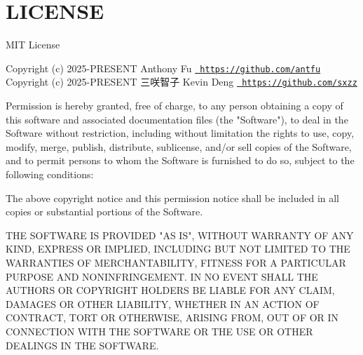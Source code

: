 \chapter{LICENSE}
\hypertarget{md_node__modules_2pnpm-workspace-yaml_2_l_i_c_e_n_s_e}{}\label{md_node__modules_2pnpm-workspace-yaml_2_l_i_c_e_n_s_e}
MIT License

Copyright (c) 2025-\/PRESENT Anthony Fu \href{https://github.com/antfu}{\texttt{ https\+://github.\+com/antfu}} Copyright (c) 2025-\/PRESENT 三咲智子 Kevin Deng \href{https://github.com/sxzz}{\texttt{ https\+://github.\+com/sxzz}}

Permission is hereby granted, free of charge, to any person obtaining a copy of this software and associated documentation files (the "{}\+Software"{}), to deal in the Software without restriction, including without limitation the rights to use, copy, modify, merge, publish, distribute, sublicense, and/or sell copies of the Software, and to permit persons to whom the Software is furnished to do so, subject to the following conditions\+:

The above copyright notice and this permission notice shall be included in all copies or substantial portions of the Software.

THE SOFTWARE IS PROVIDED "{}\+AS IS"{}, WITHOUT WARRANTY OF ANY KIND, EXPRESS OR IMPLIED, INCLUDING BUT NOT LIMITED TO THE WARRANTIES OF MERCHANTABILITY, FITNESS FOR A PARTICULAR PURPOSE AND NONINFRINGEMENT. IN NO EVENT SHALL THE AUTHORS OR COPYRIGHT HOLDERS BE LIABLE FOR ANY CLAIM, DAMAGES OR OTHER LIABILITY, WHETHER IN AN ACTION OF CONTRACT, TORT OR OTHERWISE, ARISING FROM, OUT OF OR IN CONNECTION WITH THE SOFTWARE OR THE USE OR OTHER DEALINGS IN THE SOFTWARE. 